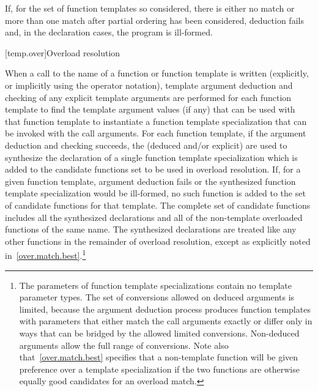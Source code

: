 \pnum
If, for the set of function templates so considered, there is either no match or
more than one match after partial ordering has been considered,
deduction fails and, in the declaration cases, the
program is ill-formed.

[temp.over]{Overload resolution}

\pnum
{}%
When a call to the name of a function or function template
is written (explicitly, or implicitly using the
operator notation), template argument deduction
and checking of any explicit template arguments are performed
for each function template to find the template argument values (if any) that
can be used with that function template to instantiate a function template
specialization that can be invoked with the call arguments.
For each function template, if the argument deduction and checking succeeds,
the
(deduced and/or explicit)
are used to synthesize the declaration of
a single function template specialization which is
added to the candidate functions set to be used in overload resolution.
If, for a given function template, argument deduction fails or
the synthesized function template specialization would be ill-formed,
no such function is added to the set of candidate functions for that template.
The complete set of candidate functions includes all the synthesized
declarations and all of the non-template overloaded functions of
the same name.
The synthesized declarations are
treated like any other functions in
the remainder of overload resolution, except as explicitly noted
in~\ref{over.match.best}.\footnote{The parameters of function template
specializations contain no
template parameter types.
The set of conversions allowed on deduced arguments is limited, because the
argument deduction process produces function templates with parameters that
either match the call arguments exactly or differ only in ways that can be
bridged by the allowed limited conversions.
Non-deduced arguments allow the full range of conversions.
Note also that~\ref{over.match.best} specifies that a non-template function will
be given preference over a template specialization if the two functions
are otherwise equally good candidates for an overload match.}

